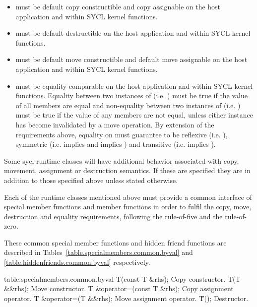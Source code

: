 \begin{itemize}

\item {} must be default copy constructible and copy assignable on the host application and within SYCL kernel functions.

\item {} must be default destructible on the host application and within SYCL kernel functions.

\item {} must be default move constructible and default move assignable on the host application and within SYCL kernel functions.

\item {} must be equality comparable on the host application and within SYCL kernel functions. Equality between two instances of  (i.e. ) must be true if the value of all members are equal and non-equality between two instances of  (i.e. ) must be true if the value of any members are not equal, unless either instance has become invalidated by a move operation. By extension of the requirements above, equality on  must guarantee to be reflexive (i.e. ), symmetric (i.e.  implies  and  implies ) and transitive (i.e.  implies ).

\end{itemize}

Some \gls{sycl-runtime} classes will have additional behavior associated with copy, movement, assignment or destruction semantics. If these are specified they are in addition to those specified above unless stated otherwise.

Each of the runtime classes mentioned above must provide a common interface of special member functions and member functions in order to fulfil the copy, move, destruction and equality requirements, following the \gls{rule-of-five} and the \gls{rule-of-zero}.

These common special member functions and hidden friend functions are described in Tables~\ref{table.specialmembers.common.byval} and \ref{table.hiddenfriends.common.byval} respectively.


{table.specialmembers.common.byval}
  \addRow
    {T(const T \&rhs);}
    {
      Copy constructor.
    }
  \addRow
    {T(T \&\&rhs);}
    {
      Move constructor.
    }  
   \addRow
   {T \&operator=(const T \&rhs);}
   {
     Copy assignment operator.
   }
   \addRow
   {T \&operator=(T \&\&rhs);}
   {
     Move assignment operator.
   }
   \addRow
   {\~T();}
   {
     Destructor.
   }
\completeTable

